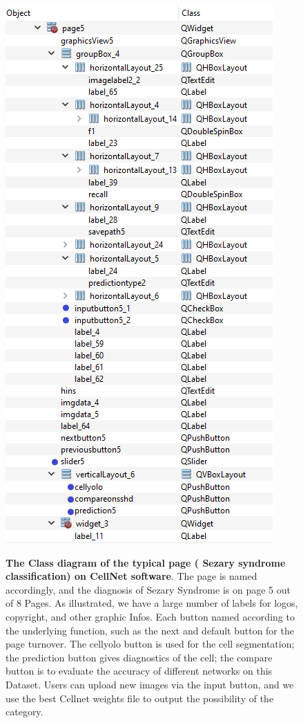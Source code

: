{\begin{figure}[t]
\begin{center}
\includegraphics[height=0.5\textheight]{thesis-template-master/images/tempsnip.png}
\label{fig:cellnet}
\end{center}
\caption{ \textbf{The Class diagram of the typical page ( Sezary syndrome classification) on CellNet software}. The page is named accordingly, and the diagnosis of Sezary Syndrome is on page 5 out of 8 Pages. As illustrated, we have a large number of labels for logos, copyright, and other graphic Infos. Each button named according to the underlying function, such as the next and default button for the page turnover. The cellyolo button is used for the cell segmentation; the prediction button gives diagnostics of the cell; the compare button is to evaluate the accuracy of different networks on this Dataset. Users can upload new images via the input button, and we use the best Cellnet weights file to output the possibility of the category.}

\end{figure}}
